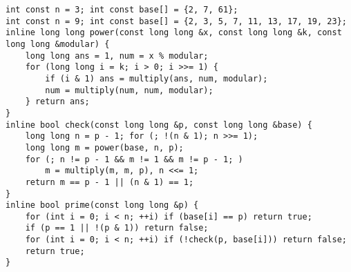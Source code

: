 \begin{lstlisting}
int const n = 3; int const base[] = {2, 7, 61};
int const n = 9; int const base[] = {2, 3, 5, 7, 11, 13, 17, 19, 23};
inline long long power(const long long &x, const long long &k, const long long &modular) {
	long long ans = 1, num = x % modular;
	for (long long i = k; i > 0; i >>= 1) {
		if (i & 1) ans = multiply(ans, num, modular);
		num = multiply(num, num, modular);
	} return ans;
}
inline bool check(const long long &p, const long long &base) {
	long long n = p - 1; for (; !(n & 1); n >>= 1);
	long long m = power(base, n, p);
	for (; n != p - 1 && m != 1 && m != p - 1; )
		m = multiply(m, m, p), n <<= 1;
	return m == p - 1 || (n & 1) == 1;
}
inline bool prime(const long long &p) {
	for (int i = 0; i < n; ++i) if (base[i] == p) return true;
	if (p == 1 || !(p & 1)) return false;
	for (int i = 0; i < n; ++i) if (!check(p, base[i])) return false;
	return true;
}
\end{lstlisting}